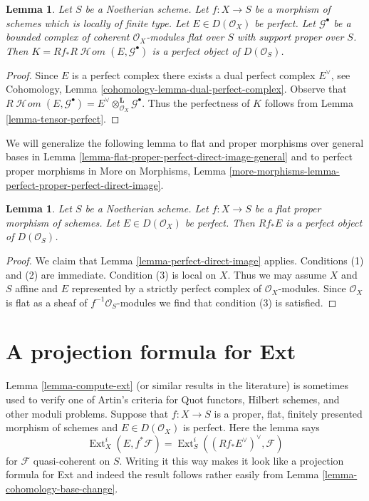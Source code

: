 \documentclass{stacks-project}
\theoremstyle{plain}
\newtheorem{lemma}[subsection]{Lemma}
\theoremstyle{definition}
\theoremstyle{remark}
\numberwithin{equation}{subsection}
\def\Ext{\mathop{\mathrm{Ext}}\nolimits}
\def\SheafHom{\mathop{\mathcal{H}\!\mathit{om}}\nolimits}
\begin{document}
\begin{lemma}
\label{lemma-ext-perfect}
Let $S$ be a Noetherian scheme. Let $f : X \to S$ be a morphism of schemes
which is locally of finite type. Let $E \in D(\mathcal{O}_X)$ be perfect.
Let $\mathcal{G}^\bullet$ be a bounded complex of coherent
$\mathcal{O}_X$-modules flat over $S$ with support proper over $S$.
Then $K = Rf_*R\SheafHom(E, \mathcal{G}^\bullet)$ is a perfect object of
$D(\mathcal{O}_S)$.
\end{lemma}

\begin{proof}
Since $E$ is a perfect complex there exists a dual perfect complex
$E^\vee$, see Cohomology, Lemma \ref{cohomology-lemma-dual-perfect-complex}.
Observe that $R\SheafHom(E, \mathcal{G}^\bullet) =
E^\vee \otimes^\mathbf{L}_{\mathcal{O}_X} \mathcal{G}^\bullet$.
Thus the perfectness of $K$ follows from Lemma \ref{lemma-tensor-perfect}.
\end{proof}

\noindent
We will generalize the following lemma to flat and proper morphisms
over general bases in
Lemma \ref{lemma-flat-proper-perfect-direct-image-general}
and to perfect proper morphisms in
More on Morphisms, Lemma
\ref{more-morphisms-lemma-perfect-proper-perfect-direct-image}.

\begin{lemma}
\label{lemma-flat-proper-perfect-direct-image}
Let $S$ be a Noetherian scheme. Let $f : X \to S$ be a flat proper
morphism of schemes. Let $E \in D(\mathcal{O}_X)$ be perfect. Then
$Rf_*E$ is a perfect object of $D(\mathcal{O}_S)$.
\end{lemma}

\begin{proof}
We claim that Lemma \ref{lemma-perfect-direct-image} applies.
Conditions (1) and (2) are immediate. Condition (3) is local
on $X$. Thus we may assume $X$ and $S$ affine and $E$
represented by a strictly perfect complex of $\mathcal{O}_X$-modules.
Since $\mathcal{O}_X$ is flat as a sheaf of $f^{-1}\mathcal{O}_S$-modules
we find that condition (3) is satisfied.
\end{proof}






\section{A projection formula for Ext}
\label{section-ext}

\noindent
Lemma \ref{lemma-compute-ext} (or similar results in the literature)
is sometimes used to verify one of Artin's criteria for
Quot functors, Hilbert schemes, and other moduli problems.
Suppose that $f : X \to S$ is a proper, flat, finitely presented
morphism of schemes and $E \in D(\mathcal{O}_X)$ is perfect.
Here the lemma says
$$
\Ext^i_X(E, f^*\mathcal{F}) =
\Ext^i_S((Rf_*E^\vee)^\vee, \mathcal{F})
$$
for $\mathcal{F}$ quasi-coherent on $S$.
Writing it this way makes it look like a projection formula
for Ext and indeed the result follows rather
easily from Lemma \ref{lemma-cohomology-base-change}.
\end{document}
